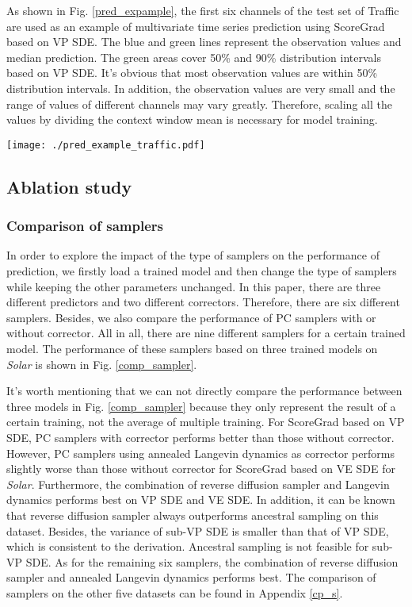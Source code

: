 As shown in Fig. \ref{pred_expample}, the first six channels of the test set of Traffic are used as an example of multivariate time series prediction using ScoreGrad based on VP SDE. The blue and green lines represent the observation values and median prediction. The green areas cover 50\% and 90\% distribution intervals based on VP SDE. It's obvious that most observation values are within 50\% distribution intervals. In addition, the observation values are very small and the range of values of different channels may vary greatly. Therefore, scaling all the values by dividing the context window mean is necessary for model training.

\begin{figure*}[t]
	\centering
	\texttt{[image: ./pred\_example\_traffic.pdf]} 
	\caption{Prediction intervals of ScoreGrad based on VP SDE and actual observations of Traffic.}
	\label{pred_expample}
\end{figure*}

\subsection{Ablation study}
\subsubsection{Comparison of samplers}
In order to explore the impact of the type of samplers on the performance of prediction, we firstly load a trained model and then change the type of samplers while keeping the other parameters unchanged. In this paper, there are three different predictors and two different correctors. Therefore, there are six different samplers. Besides, we also compare the performance of PC samplers with or without corrector. All in all, there are nine different samplers for a certain trained model. The performance of these samplers based on three trained models on \textit{Solar} is shown in Fig. \ref{comp_sampler}. 

It's worth mentioning that we can not directly compare the performance between three models in Fig. \ref{comp_sampler} because they only represent the result of a certain training, not the average of multiple training.  For ScoreGrad based on VP SDE, PC samplers with corrector performs better than those without corrector. However, PC samplers using annealed Langevin dynamics as corrector performs slightly worse than those without corrector for ScoreGrad based on VE SDE for \textit{Solar}. Furthermore, the combination of reverse diffusion sampler and Langevin dynamics performs best on VP SDE and VE SDE. In addition, it can be known that reverse diffusion sampler always outperforms ancestral sampling on this dataset. Besides, the variance of sub-VP SDE is smaller than that of VP SDE, which is consistent to the derivation. Ancestral sampling is not feasible for sub-VP SDE. As for the remaining six samplers, the combination of reverse diffusion sampler and annealed Langevin dynamics performs best. The comparison of samplers on the other five datasets can be found in Appendix \ref{cp_s}.

